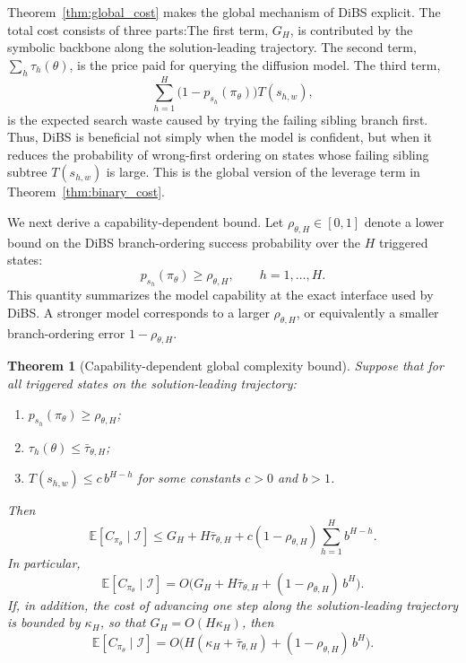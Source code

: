 \documentclass[lettersize,journal]{IEEEtran}
\newtheorem{theorem}{Theorem}
\begin{document}
Theorem~\ref{thm:global_cost} makes the global mechanism of DiBS
explicit. The total cost consists of three parts:The first term, \(G_H\), is contributed by the symbolic backbone along
the solution-leading trajectory. The second term,
\(\sum_h \tau_h(\theta)\), is the price paid for querying the diffusion
model. The third term,
\[
\sum_{h=1}^{H}
\bigl(1-p_{s_h}(\pi_\theta)\bigr)T(s_{h,w}),
\]
is the expected search waste caused by trying the failing sibling branch
first. Thus, DiBS is beneficial not simply when the model is confident,
but when it reduces the probability of wrong-first ordering on states
whose failing sibling subtree \(T(s_{h,w})\) is large. This is the global
version of the leverage term in Theorem~\ref{thm:binary_cost}.

We next derive a capability-dependent bound. Let
\(\rho_{\theta,H}\in[0,1]\) denote a lower bound on the DiBS
branch-ordering success probability over the \(H\) triggered states:
\[
p_{s_h}(\pi_\theta)\ge \rho_{\theta,H},
\qquad h=1,\dots,H.
\]
This quantity summarizes the model capability at the exact interface
used by DiBS. A stronger model corresponds to a larger
\(\rho_{\theta,H}\), or equivalently a smaller branch-ordering error
\(1-\rho_{\theta,H}\).

\begin{theorem}[Capability-dependent global complexity bound]
	\label{thm:capability_bound}
	Suppose that for all triggered states on the solution-leading trajectory:
	\begin{enumerate}
		\item \(p_{s_h}(\pi_\theta)\ge \rho_{\theta,H}\);
		\item \(\tau_h(\theta)\le \bar{\tau}_{\theta,H}\);
		\item \(T(s_{h,w}) \le c\, b^{H-h}\) for some constants \(c>0\)
		and \(b>1\).
	\end{enumerate}
	Then
	\begin{equation}
		\mathbb{E}[C_{\pi_\theta}\mid \mathcal{I}]
		\le
		G_H
		+
		H\bar{\tau}_{\theta,H}
		+
		c(1-\rho_{\theta,H})
		\sum_{h=1}^{H} b^{H-h}.
		\label{eq:capability_bound_pre}
	\end{equation}
	In particular,
	\begin{equation}
		\mathbb{E}[C_{\pi_\theta}\mid \mathcal{I}]
		=
		O\!\Big(
		G_H
		+
		H\bar{\tau}_{\theta,H}
		+
		(1-\rho_{\theta,H})\, b^H
		\Big).
		\label{eq:capability_bound}
	\end{equation}
	If, in addition, the cost of advancing one step along the
	solution-leading trajectory is bounded by \(\kappa_H\), so that
	\(G_H=O(H\kappa_H)\), then
	\begin{equation}
		\mathbb{E}[C_{\pi_\theta}\mid \mathcal{I}]
		=
		O\!\Big(
		H(\kappa_H+\bar{\tau}_{\theta,H})
		+
		(1-\rho_{\theta,H})\, b^H
		\Big).
		\label{eq:capability_bound_with_path}
	\end{equation}
\end{theorem}
\end{document}
